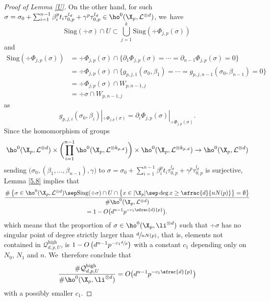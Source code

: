 \begin{proof}[Proof of Lemma \ref{U}]
On the other hand, for such $\sigma=\sigma_0+\sum_{i=1}^{n-1} \beta_i^pt_i\tau_{0,p}^{l_d}+\gamma^p\tau_{0,p}^{l_d}\in \ho^0(\X_p,\mathcal{L}^{\otimes d})$, we~have
\[
\mathrm{Sing}(\div \sigma)\cap U \subset \bigcup_{j=1}^k \mathrm{Sing}(\div \Phi_{j,p}(\sigma))
\]
and
\begin{align*}
\mathrm{Sing}(\div \Phi_{j,p}(\sigma))
&= \div \Phi_{j,p}(\sigma)\cap \{ \partial_1\Phi_{j,p}(\sigma)=\cdots =\partial_{n-1}\Phi_{j,p}(\sigma)=0 \} \\
&= \div \Phi_{j,p}(\sigma)\cap \{ g_{p,j,1}(\sigma_0,\beta_1)=\cdots = g_{p,j,n-1}(\sigma_0,\beta_{n-1})=0 \} \\
&= \div \Phi_{j,p}(\sigma)\cap W_{p,n-1,j} \\
&= \div \sigma\cap W_{p,n-1,j}
\end{align*}
as
\[
g_{p,j,i}(\sigma_0,\beta_i)|_{ \div \Phi_{j,p}(\sigma)}=\partial_i\Phi_{j,p}(\sigma)|_{ \div \Phi_{j,p}(\sigma)}.
\]
Since the homomorphism of groups
\begin{align*}
\ho^0(\X_p,\mathcal{L}^{\otimes d})\times \biggl(\prod_{i=1}^{n-1} \ho^0(\X_p,\mathcal{L}^{\otimes k_{p,d}}) \biggr) \times \ho^0(\X_p, \mathcal{L}^{\otimes k_{p,d}}) \to \ho^0(\X_p, \mathcal{L}^{\otimes d})
\end{align*}
sending $\big(\sigma_0, (\beta_1,\dots, \beta_{n-1}), \gamma\big)$ to $\sigma=\sigma_0+\sum_{i=1}^{n-1} \beta_i^pt_i\tau_{0,p}^{l_d}+\gamma^p\tau_{0,p}^{l_d}$ is surjective, Lemma \ref{5.8} implies that
\begin{multline*}
\frac{\#\left\{\sigma\in \ho^0(\X_p, \mathcal{L}^{\otimes d})\sep \mathrm{Sing}(\div \sigma)\cap U\cap \big\{ x\in |\X_p|\sep \deg x\geq\sfrac{d}{nN(p)} \big\}=\emptyset \right\}}{\# \ho^0(\X_p, \mathcal{L}^{\otimes d})}\\
= 1-O\bigl(d^{n-1}p^{-c_1\sfrac{d}{p}} \bigr).
\end{multline*}
which means that the proportion of $\sigma\in \ho^0(\X_p, \li^{\otimes d})$ such that $\div \sigma$ has no singular point of degree strictly larger than $\sfrac{d}{nN(p)}$, that is, elements not contained in $\mathcal{Q}_{d,p,U}^{\mathrm{high}}$, is $1-O\left(d^{n-1}p^{-c_1\sfrac{d}{p}} \right)$ with a constant $c_1$ depending only on $N_0$, $N_1$ and $n$. We~therefore conclude that
\[
\frac{\#\mathcal{Q}_{d,p,U}^{\mathrm{high}}}{\#\ho^0(\X_p, \li^{\otimes d})}=O\bigl(d^{n-1}p^{-c_1\sfrac{d}{p}}\bigr)
\]
with a possibly smaller $c_1$. 


\end{proof}
